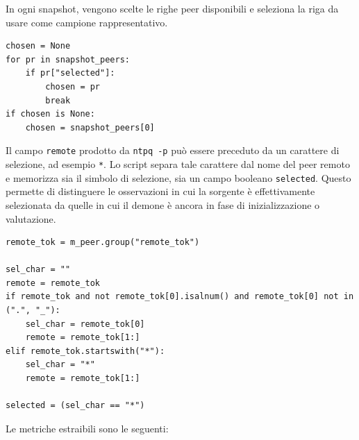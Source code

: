 In ogni snapshot, vengono scelte le righe peer disponibili e seleziona la
riga da usare come campione rappresentativo.

\begin{listing}[H]
\begin{verbatim}
chosen = None
for pr in snapshot_peers:
    if pr["selected"]:
        chosen = pr
        break
if chosen is None:
    chosen = snapshot_peers[0]
\end{verbatim}
\caption{Selezione del peer rappresentativo nello snapshot NTPsec.}
\label{lst:ntpsec-peer-selection}
\end{listing}

Il campo \texttt{remote} prodotto da \texttt{ntpq -p} può essere preceduto da un
carattere di selezione, ad esempio \texttt{*}. Lo script separa tale carattere
dal nome del peer remoto e memorizza sia il simbolo di selezione, sia un campo
booleano \texttt{selected}. Questo permette di distinguere le osservazioni in cui
la sorgente è effettivamente selezionata da quelle in cui il demone è ancora in
fase di inizializzazione o valutazione.

\begin{listing}[H]
\begin{verbatim}
remote_tok = m_peer.group("remote_tok")

sel_char = ""
remote = remote_tok
if remote_tok and not remote_tok[0].isalnum() and remote_tok[0] not in (".", "_"):
    sel_char = remote_tok[0]
    remote = remote_tok[1:]
elif remote_tok.startswith("*"):
    sel_char = "*"
    remote = remote_tok[1:]

selected = (sel_char == "*")
\end{verbatim}
\caption{Separazione del carattere di selezione dal nome del peer remoto.}
\label{lst:ntpsec-selected-peer}
\end{listing}

Le metriche estraibili sono le seguenti:

